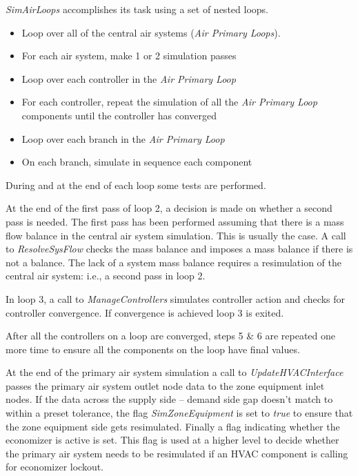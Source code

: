 \emph{SimAirLoops} accomplishes its task using a set of nested loops.

\begin{itemize}
\item
  Loop over all of the central air systems (\emph{Air Primary Loops}).
\item
  For each air system, make 1 or 2 simulation passes
\item
  Loop over each controller in the \emph{Air Primary Loop}
\item
  For each controller, repeat the simulation of all the \emph{Air Primary Loop} components until the controller has converged
\item
  Loop over each branch in the \emph{Air Primary Loop}
\item
  On each branch, simulate in sequence each component
\end{itemize}

During and at the end of each loop some tests are performed.

At the end of the first pass of loop 2, a decision is made on whether a second pass is needed. The first pass has been performed assuming that there is a mass flow balance in the central air system simulation. This is usually the case. A call to \emph{ResolveSysFlow} checks the mass balance and imposes a mass balance if there is not a balance. The lack of a system mass balance requires a resimulation of the central air system: i.e., a second pass in loop 2.

In loop 3, a call to \emph{ManageControllers} simulates controller action and checks for controller convergence. If convergence is achieved loop 3 is exited.

After all the controllers on a loop are converged, steps 5 \& 6 are repeated one more time to ensure all the components on the loop have final values.

At the end of the primary air system simulation a call to \emph{UpdateHVACInterface} passes the primary air system outlet node data to the zone equipment inlet nodes. If the data across the supply side -- demand side gap doesn't match to within a preset tolerance, the flag \emph{SimZoneEquipment} is set to \emph{true} to ensure that the zone equipment side gets resimulated. Finally a flag indicating whether the economizer is active is set. This flag is used at a higher level to decide whether the primary air system needs to be resimulated if an HVAC component is calling for economizer lockout.

